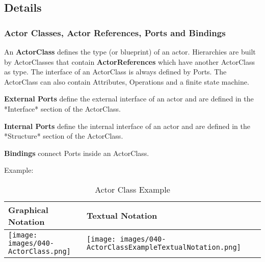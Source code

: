 

\subsection{Details}

\subsubsection{Actor Classes, Actor References, Ports and Bindings}

An \textbf{ActorClass} defines the type (or blueprint) of an actor. Hierarchies are built by ActorClasses that contain \textbf{ActorReferences} which have another ActorClass as type. The interface of an ActorClass is always defined by Ports. The ActorClass can also contain Attributes, Operations and a finite state machine. 

\textbf{External Ports} define the external interface of an actor and are defined in the *Interface* section of the ActorClass.

\textbf{Internal Ports} define the internal interface of an actor and are defined in the *Structure* section of the ActorClass.

\textbf{Bindings} connect Ports inside an ActorClass.

Example:

\begin{table}
\caption{Actor Class Example}
\begin{tabular}{|l|l|l|}
\hline
 \textbf{Graphical Notation} & \textbf{Textual Notation} \\ \hline
 \texttt{[image: images/040-ActorClass.png]} & \texttt{[image: images/040-ActorClassExampleTextualNotation.png]} \\ \hline
 \end{tabular}
 \end{table}
 

